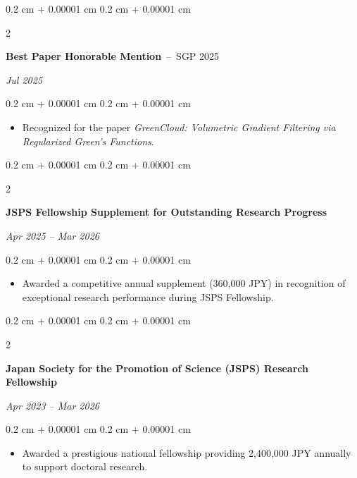 \documentclass[10pt, letterpaper]{article}
\newenvironment{highlights}{
    \begin{itemize}[
        topsep=0.10 cm,
        parsep=0.10 cm,
        partopsep=0pt,
        itemsep=0pt,
        leftmargin=0.4 cm + 10pt
    ]
}{
    \end{itemize}
} %
\newenvironment{onecolentry}{
    \begin{adjustwidth}{
        0.2 cm + 0.00001 cm
    }{
        0.2 cm + 0.00001 cm
    }
}{
    \end{adjustwidth}
} %
\newenvironment{twocolentry}[2][]{
    \onecolentry
    \def\secondColumn{#2}
    \setcolumnwidth{\fill, 4.5 cm}
    \begin{paracol}{2}
}{
    \switchcolumn \raggedleft \secondColumn
    \end{paracol}
    \endonecolentry
} %
\begin{document}
        \vspace{0.2 cm}
        \begin{twocolentry}{
        \textit{Jul 2025}}
            \textbf{Best Paper Honorable Mention}
            \,--\,
            SGP 2025
        \end{twocolentry}
        \vspace{0.10 cm}
        \begin{onecolentry}
            \begin{highlights}
                \item Recognized for the paper \textit{GreenCloud: Volumetric Gradient Filtering via Regularized Green’s Functions}.
            \end{highlights}
        \end{onecolentry}

        \vspace{0.2 cm}
        \begin{twocolentry}{
        \textit{Apr 2025 -- Mar 2026}}
            \textbf{JSPS Fellowship Supplement for Outstanding Research Progress}
        \end{twocolentry}
        \vspace{0.10 cm}
        \begin{onecolentry}
            \begin{highlights}
                \item Awarded a competitive annual supplement (360,000 JPY) in recognition of exceptional research performance during JSPS Fellowship.
            \end{highlights}
        \end{onecolentry}

        \vspace{0.2 cm}
        \begin{twocolentry}{
        \textit{Apr 2023 -- Mar 2026}}
            \textbf{Japan Society for the Promotion of Science (JSPS) Research Fellowship}
        \end{twocolentry}
        \vspace{0.10 cm}
        \begin{onecolentry}
            \begin{highlights}
                \item Awarded a prestigious national fellowship providing 2,400,000 JPY annually to support doctoral research.
            \end{highlights}
        \end{onecolentry}
\end{document}
